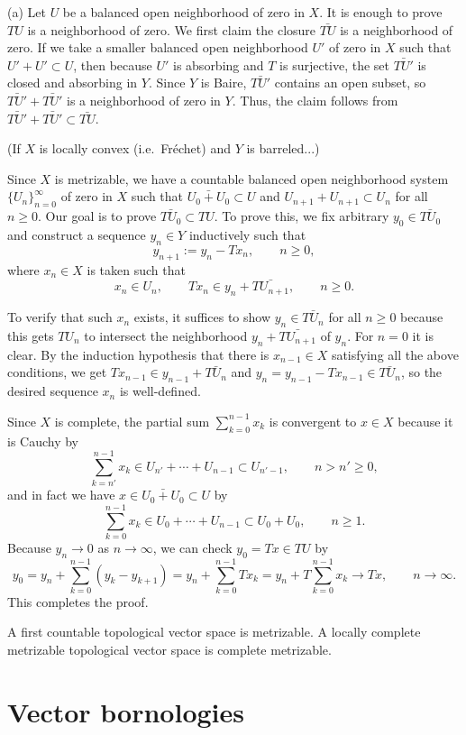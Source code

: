 \documentclass{../../large}
\begin{document}
\begin{pf}
(a)
Let $U$ be a balanced open neighborhood of zero in $X$.
It is enough to prove $TU$ is a neighborhood of zero.
We first claim the closure $\bar{TU}$ is a neighborhood of zero.
If we take a smaller balanced open neighborhood $U'$ of zero in $X$ such that $U'+U'\subset U$, then because $U'$ is absorbing and $T$ is surjective, the set $\bar{TU'}$ is closed and absorbing in $Y$.
Since $Y$ is Baire, $\bar{TU'}$ contains an open subset, so $\bar{TU'}+\bar{TU'}$ is a neighborhood of zero in $Y$.
Thus, the claim follows from $\bar{TU'}+\bar{TU'}\subset\bar{TU}$.

(If $X$ is locally convex (i.e.~Fr\'echet) and $Y$ is barreled...)

Since $X$ is metrizable, we have a countable balanced open neighborhood system $\{U_n\}_{n=0}^\infty$ of zero in $X$ such that $\bar{U_0+U_0}\subset U$ and $U_{n+1}+U_{n+1}\subset U_n$ for all $n\ge0$.
Our goal is to prove $\bar{TU_0}\subset TU$.
To prove this, we fix arbitrary $y_0\in\bar{TU_0}$ and construct a sequence $y_n\in Y$ inductively such that
\[y_{n+1}:=y_n-Tx_n,\qquad n\ge0,\]
where $x_n\in X$ is taken such that
\[x_n\in U_n,\qquad Tx_n\in y_n+\bar{TU_{n+1}},\qquad n\ge0.\]

To verify that such $x_n$ exists, it suffices to show $y_n\in\bar{TU_n}$ for all $n\ge0$ because this gets $TU_n$ to intersect the neighborhood $y_n+\bar{TU_{n+1}}$ of $y_n$.
For $n=0$ it is clear.
By the induction hypothesis that there is $x_{n-1}\in X$ satisfying all the above conditions, we get $Tx_{n-1}\in y_{n-1}+\bar{TU_n}$ and $y_n=y_{n-1}-Tx_{n-1}\in\bar{TU_n}$, so the desired sequence $x_n$ is well-defined.

Since $X$ is complete, the partial sum $\sum_{k=0}^{n-1}x_k$ is convergent to $x\in X$ because it is Cauchy by
\[\sum_{k=n'}^{n-1}x_k\in U_{n'}+\cdots+U_{n-1}\subset U_{n'-1},\qquad n>n'\ge0,\]
and in fact we have $x\in\bar{U_0+U_0}\subset U$ by
\[\sum_{k=0}^{n-1}x_k\in U_0+\cdots+U_{n-1}\subset U_0+U_0,\qquad n\ge1.\]
Because $y_n\to0$ as $n\to\infty$, we can check $y_0=Tx\in TU$ by
\[y_0=y_n+\sum_{k=0}^{n-1}(y_k-y_{k+1})=y_n+\sum_{k=0}^{n-1}Tx_k=y_n+T\sum_{k=0}^{n-1}x_k\to Tx,\qquad n\to\infty.\]
This completes the proof.
\end{pf}

A first countable topological vector space is metrizable.
A locally complete metrizable topological vector space is complete metrizable.



\section{Vector bornologies}
\end{document}

